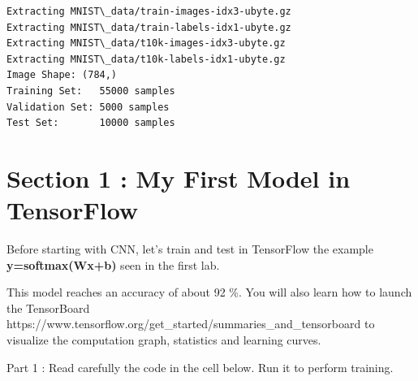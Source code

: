 \documentclass[11pt]{article}
\begin{document}
    \begin{Verbatim}[commandchars=\\\{\}]
Extracting MNIST\_data/train-images-idx3-ubyte.gz
Extracting MNIST\_data/train-labels-idx1-ubyte.gz
Extracting MNIST\_data/t10k-images-idx3-ubyte.gz
Extracting MNIST\_data/t10k-labels-idx1-ubyte.gz
Image Shape: (784,)
Training Set:   55000 samples
Validation Set: 5000 samples
Test Set:       10000 samples

    \end{Verbatim}

    \section{Section 1 : My First Model in
TensorFlow}\label{section-1-my-first-model-in-tensorflow}

    Before starting with CNN, let's train and test in TensorFlow the example
\textbf{y=softmax(Wx+b)} seen in the first lab.

This model reaches an accuracy of about 92 \%. You will also learn how
to launch the TensorBoard
https://www.tensorflow.org/get\_started/summaries\_and\_tensorboard to
visualize the computation graph, statistics and learning curves.

     Part 1 : Read carefully the code in the cell below. Run it to perform
training.
\end{document}
